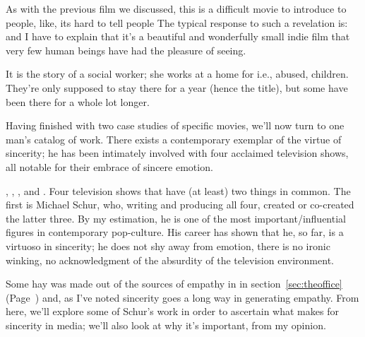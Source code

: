 \documentclass[../butidigress.tex]{subfiles}
\begin{document}
As with the previous film we discussed, this is a difficult movie to introduce to people, like, its hard to tell people 
The typical response to such a revelation is:  and I have to explain that it's a beautiful and wonderfully small indie film that very few human beings have had the pleasure of seeing.

It is the story of a social worker; she works at a home for  i.e., abused, children.
They're only supposed to stay there for a year (hence the title), but some have been there for a whole lot longer.


\entryskip

Having finished with two case studies of specific movies, we'll now turn to one man's catalog of work.
There exists a contemporary exemplar of the virtue of sincerity; he has been intimately involved with four acclaimed television shows, all notable for their embrace of sincere emotion.


, , , and .
Four television shows that have (at least) two things in common.
The first is Michael Schur, who, writing and producing all four, created or co-created the latter three.
By my estimation, he is one of the most important/influential figures in contemporary pop-culture.
His career has shown that he, so far, is a virtuoso in sincerity; he does not shy away from emotion, there is no ironic winking, no acknowledgment of the absurdity of the television environment.

Some hay was made out of the sources of empathy in  in section~\ref{sec:theoffice} (Page~\pageref{sec:theoffice}) and, as I've noted sincerity goes a long way in generating empathy.
From here, we'll explore some of Schur's work in order to ascertain what makes for sincerity in media; we'll also look at why it's important, from my opinion.
\end{document}

